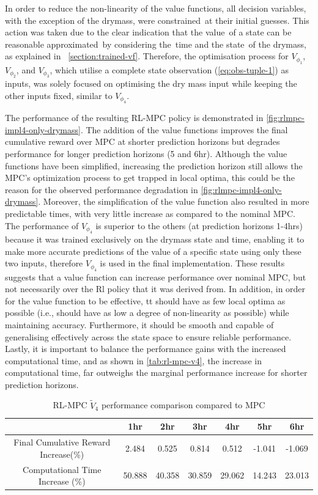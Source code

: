 In order to reduce the non-linearity of the value functions, all decision variables, with the exception of the drymass, were constrained at their initial guesses. This action was taken due to the clear indication that the value of a state can be reasonable approximated by considering the time and the state of the drymass, as explained in  \autoref{section:trained-vf}. Therefore, the optimisation process for ${V}_{\phi_1}$, ${V}_{\phi_2}$, and ${V}_{\phi_3}$, which utilise a complete state observation (\autoref{eq:obs-tuple-1}) as inputs, was solely focused on optimising the dry mass input while keeping the other inputs fixed, similar to ${V}_{\phi_4}$.

The performance of the resulting RL-MPC policy is demonstrated in \autoref{fig:rlmpc-impl4-only-drymass}. The addition of the value functions improves the final cumulative reward over MPC at shorter prediction horizons but degrades performance for longer prediction horizons (5 and 6hr). Although the value functions have been simplified, increasing the prediction horizon still allows the MPC's optimization process to get trapped in local optima, this could be the reason for the observed performance degradation in \autoref{fig:rlmpc-impl4-only-drymass}. Moreover, the simplification of the value function also resulted in more predictable times, with very little increase as compared to the nominal MPC.\\

The performance of ${V}_{\phi_4}$ is superior to the others (at prediction horizons 1-4hrs) because it was trained exclusively on the drymass state and time, enabling it to make more accurate predictions of the value of a specific state using only these two inputs, therefore ${V}_{\phi_4}$ is used in the final implementation. These results suggests that a value function can increase performance over nominal MPC, but not necessarily over the Rl policy that it was derived from. In addition, in order for the value function to be effective, tt should have as few local optima as possible (i.e., should have as low a degree of non-linearity as possible) while maintaining accuracy. Furthermore, it should be smooth and capable of generalising effectively across the state space to ensure reliable performance. Lastly, it is important to balance the performance gains with the increased computational time, and as shown in \autoref{tab:rl-mpc-v4}, the increase in computational time, far outweighs the marginal performance increase for shorter prediction horizons.

\begin{table}[H]
	\centering
	\begin{tabular}{|c|cccccc|}
		\hline
		&1hr&2hr&3hr&4hr&5hr&6hr\\
		\hline
		Final Cumulative Reward Increase(\%) &2.484 &0.525&0.814&0.512&-1.041& -1.069\\
		\hline
		Computational Time Increase     (\%) &50.888 &40.358&30.859&29.062&14.243& 23.013\\
		\hline
	\end{tabular}
	\caption{RL-MPC $\tilde{V}_4$ performance comparison compared to MPC}
	\label{tab:rl-mpc-v4}
\end{table}



